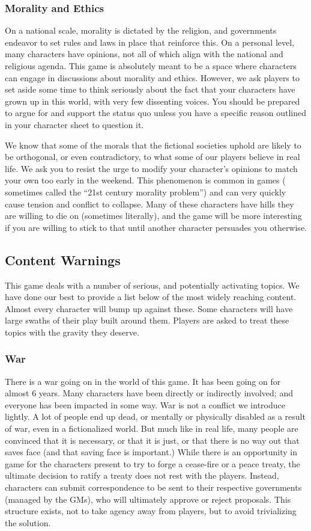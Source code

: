 \documentclass[sheet]{GL2020}
\begin{document}
\subsubsection{Morality and Ethics}
On a national scale, morality is dictated by the religion, and governments endeavor to set rules and laws in place that reinforce this. On a personal level, many characters have opinions, not all of which align with the national and religious agenda. This game is absolutely meant to be a space where characters can engage in discussions about morality and ethics. However, we ask players to set aside some time to think seriously about the fact that your characters have grown up in this world, with very few dissenting voices. You should be prepared to argue for and support the status quo unless you have a specific reason outlined in your character sheet to question it.

We know that some of the morals that the fictional societies uphold are likely to be orthogonal, or even contradictory, to what some of our players believe in real life. We ask you to resist the urge to modify your character’s opinions to match your own too early in the weekend. This phenomenon is common in games ( sometimes called the “21st century morality problem”) and can very quickly cause tension and conflict to collapse. Many of these characters have hills they are willing to die on (sometimes literally), and the game will be more interesting if you are willing to stick to that until another character persuades you otherwise. 

\subsection{Content Warnings}
This game deals with a number of serious, and potentially activating topics. We have done our best to provide a list below of the most widely reaching content. Almost every character will bump up against these. Some characters will have large swaths of their play built around them. Players are asked to treat these topics with the gravity they deserve.

\subsubsection{War}
There is a war going on in the world of this game. It has been going on for almost 6 years. Many characters have been directly or indirectly involved; and everyone has been impacted in some way. War is not a conflict we introduce lightly. A lot of people end up dead, or mentally or physically disabled as a result of war, even in a fictionalized world. But much like in real life, many people are convinced that it is necessary, or that it is just, or that there is no way out that saves face (and that saving face is important.) While there is an opportunity in game for the characters present to try to forge a cease-fire or a peace treaty, the ultimate decision to ratify a treaty does not rest with the players. Instead, characters can submit correspondence to be sent to their respective governments (managed by the GMs), who will ultimately approve or reject proposals. This structure exists, not to take agency away from players, but to avoid trivializing the solution. 
\end{document}
